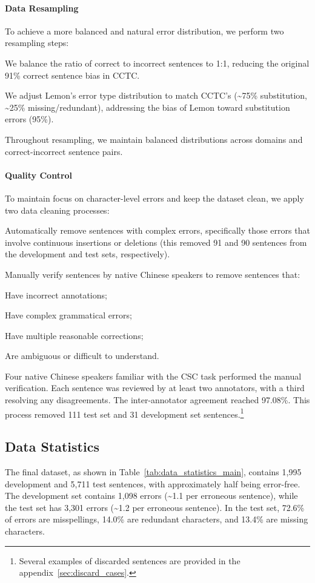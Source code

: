 \paragraph{Data Resampling}
To achieve a more balanced and natural error distribution, we perform two resampling steps:
\begin{inparaenum}[\itshape a)]
    \item We balance the ratio of correct to incorrect sentences to 1:1, reducing the original 91\% correct sentence bias in CCTC.
    \item We adjust Lemon's error type distribution to match CCTC's (\textasciitilde{}75\% substitution, \textasciitilde{}25\% missing/redundant), addressing the bias of Lemon toward substitution errors (95\%).
\end{inparaenum}
Throughout resampling, we maintain balanced distributions across domains and correct-incorrect sentence pairs.

\paragraph{Quality Control}
To maintain focus on character-level errors and keep the dataset clean, we apply two data cleaning processes:
\begin{inparaenum}[\itshape a)]
    \item Automatically remove sentences with complex errors, specifically those errors that involve continuous insertions or deletions (this removed 91 and 90 sentences from the development and test sets, respectively).
    \item Manually verify sentences by native Chinese speakers to remove sentences that:
    \begin{inparaenum}[\itshape i.]
        \item Have incorrect annotations;
        \item Have complex grammatical errors;
        \item Have multiple reasonable corrections;
        \item Are ambiguous or difficult to understand.
    \end{inparaenum}
\end{inparaenum}
Four native Chinese speakers familiar with the CSC task performed the manual verification.
Each sentence was reviewed by at least two annotators, with a third resolving any disagreements.
The inter-annotator agreement reached 97.08\%.
This process removed 111 test set and 31 development set sentences.\footnote{Several examples of discarded sentences are provided in the appendix~\ref{sec:discard_cases}.}

\subsection{Data Statistics}
The final dataset, as shown in Table~\ref{tab:data_statistics_main}, contains 1,995 development and 5,711 test sentences, with approximately half being error-free. The development set contains 1,098 errors (\textasciitilde{}1.1 per erroneous sentence), while the test set has 3,301 errors (\textasciitilde{}1.2 per erroneous sentence).
In the test set, 72.6\% of errors are misspellings, 14.0\% are redundant characters, and 13.4\% are missing characters.

